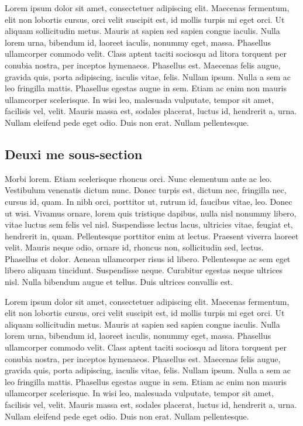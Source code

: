 \documentclass{article}
\begin{document}
Lorem ipsum dolor sit amet, consectetuer adipiscing elit. Maecenas fermentum, elit non lobortis cursus, orci velit suscipit est, id mollis turpis mi eget orci. Ut aliquam sollicitudin metus. Mauris at sapien sed sapien congue iaculis. Nulla lorem urna, bibendum id, laoreet iaculis, nonummy eget, massa. Phasellus ullamcorper commodo velit. Class aptent taciti sociosqu ad litora torquent per conubia nostra, per inceptos hymenaeos. Phasellus est. Maecenas felis augue, gravida quis, porta adipiscing, iaculis vitae, felis. Nullam ipsum. Nulla a sem ac leo fringilla mattis. Phasellus egestas augue in sem. Etiam ac enim non mauris ullamcorper scelerisque. In wisi leo, malesuada vulputate, tempor sit amet, facilisis vel, velit. Mauris massa est, sodales placerat, luctus id, hendrerit a, urna. Nullam eleifend pede eget odio. Duis non erat. Nullam pellentesque.


\subsection{Deuxi me sous-section}

Morbi lorem. Etiam scelerisque rhoncus orci. Nunc elementum ante ac leo. Vestibulum venenatis dictum nunc. Donec turpis est, dictum nec, fringilla nec, cursus id, quam. In nibh orci, porttitor ut, rutrum id, faucibus vitae, leo. Donec ut wisi. Vivamus ornare, lorem quis tristique dapibus, nulla nisl nonummy libero, vitae luctus sem felis vel nisl. Suspendisse lectus lacus, ultricies vitae, feugiat et, hendrerit in, quam. Pellentesque porttitor enim at lectus. Praesent viverra laoreet velit. Mauris neque odio, ornare id, rhoncus non, sollicitudin sed, lectus. Phasellus et dolor. Aenean ullamcorper risus id libero. Pellentesque ac sem eget libero aliquam tincidunt. Suspendisse neque. Curabitur egestas neque ultrices nisl. Nulla bibendum augue et tellus. Duis ultrices convallis est.

Lorem ipsum dolor sit amet, consectetuer adipiscing elit. Maecenas fermentum, elit non lobortis cursus, orci velit suscipit est, id mollis turpis mi eget orci. Ut aliquam sollicitudin metus. Mauris at sapien sed sapien congue iaculis. Nulla lorem urna, bibendum id, laoreet iaculis, nonummy eget, massa. Phasellus ullamcorper commodo velit. Class aptent taciti sociosqu ad litora torquent per conubia nostra, per inceptos hymenaeos. Phasellus est. Maecenas felis augue, gravida quis, porta adipiscing, iaculis vitae, felis. Nullam ipsum. Nulla a sem ac leo fringilla mattis. Phasellus egestas augue in sem. Etiam ac enim non mauris ullamcorper scelerisque. In wisi leo, malesuada vulputate, tempor sit amet, facilisis vel, velit. Mauris massa est, sodales placerat, luctus id, hendrerit a, urna. Nullam eleifend pede eget odio. Duis non erat. Nullam pellentesque.
\end{document}
